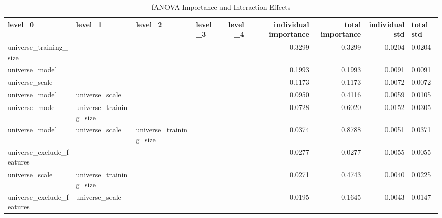 \begin{table}
\centering
\caption{fANOVA Importance and Interaction Effects}
\label{tab:fanova_importance}
\begin{tabular}{llllrrrr}
\toprule
                   level\_0 &                    level\_1 &                level\_2 &                level\_3 &                level\_4 & individual importance & total importance & individual std & total std \\
\midrule
    universe\_training\_size &                            &                        &                        &                        &                0.3299 &           0.3299 &         0.0204 &    0.0204 \\
            universe\_model &                            &                        &                        &                        &                0.1993 &           0.1993 &         0.0091 &    0.0091 \\
            universe\_scale &                            &                        &                        &                        &                0.1173 &           0.1173 &         0.0072 &    0.0072 \\
            universe\_model &             universe\_scale &                        &                        &                        &                0.0950 &           0.4116 &         0.0059 &    0.0105 \\
            universe\_model &     universe\_training\_size &                        &                        &                        &                0.0728 &           0.6020 &         0.0152 &    0.0305 \\
            universe\_model &             universe\_scale & universe\_training\_size &                        &                        &                0.0374 &           0.8788 &         0.0051 &    0.0371 \\
 universe\_exclude\_features &                            &                        &                        &                        &                0.0277 &           0.0277 &         0.0055 &    0.0055 \\
            universe\_scale &     universe\_training\_size &                        &                        &                        &                0.0271 &           0.4743 &         0.0040 &    0.0225 \\
 universe\_exclude\_features &             universe\_scale &                        &                        &                        &                0.0195 &           0.1645 &         0.0043 &    0.0147 \\

\end{tabular}
\end{table}
